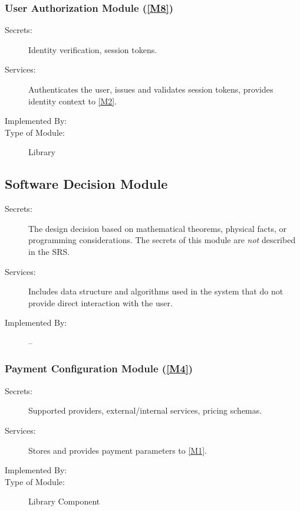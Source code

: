 \documentclass[12pt, titlepage]{article}
\begin{document}
\subsubsection{User Authorization Module (\ref{M8})}

\begin{description}
\item[Secrets:] Identity verification, session tokens. 
\item[Services:] Authenticates the user, issues and validates session tokens, provides identity context to \ref{M2}.
\item[Implemented By:] \progname{}
\item[Type of Module:] Library
\end{description}

\subsection{Software Decision Module}

\begin{description}
\item[Secrets:] The design decision based on mathematical theorems, physical
  facts, or programming considerations. The secrets of this module are
  \emph{not} described in the SRS.
\item[Services:] Includes data structure and algorithms used in the system that
  do not provide direct interaction with the user. 
\item[Implemented By:] --
\end{description}

\subsubsection{Payment Configuration Module (\ref{M4})}

\begin{description}
\item[Secrets:] Supported providers, external/internal services, pricing schemas.
\item[Services:] Stores and provides payment parameters to \ref{M1}. 
\item[Implemented By:] \progname{}
\item[Type of Module:] Library Component
\end{description}
\end{document}
